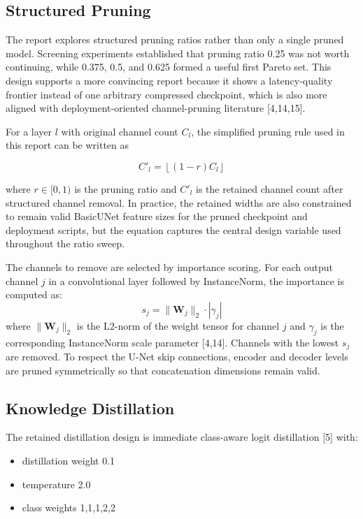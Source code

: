 \hypertarget{structured-pruning}{%
\subsection{Structured Pruning}\label{structured-pruning}}

The report explores structured pruning ratios rather than only a single
pruned model. Screening experiments established that pruning ratio
0.25 was not worth continuing, while 0.375,
0.5, and 0.625 formed a useful first Pareto set. This
design supports a more convincing report because it shows a
latency-quality frontier instead of one arbitrary compressed checkpoint,
which is also more aligned with deployment-oriented channel-pruning
literature {[}4,14,15{]}.

For a layer \(l\) with original channel count \(C_l\), the simplified
pruning rule used in this report can be written as

\[
C'_l = \left\lfloor (1-r) C_l \right\rfloor
\]

where \(r \in [0,1)\) is the pruning ratio and \(C'_l\) is the retained
channel count after structured channel removal. In practice, the
retained widths are also constrained to remain valid BasicUNet feature
sizes for the pruned checkpoint and deployment scripts, but the equation captures the central design variable used throughout the ratio sweep.

The channels to remove are selected by importance scoring. For each output channel $j$ in a convolutional layer followed by InstanceNorm, the importance is computed as:
\[
s_j = \| \mathbf{W}_j \|_2 \cdot |\gamma_j|
\]
where $\| \mathbf{W}_j \|_2$ is the L2-norm of the weight tensor for channel $j$ and $\gamma_j$ is the corresponding InstanceNorm scale parameter {[}4,14{]}. Channels with the lowest $s_j$ are removed. To respect the U-Net skip connections, encoder and decoder levels are pruned symmetrically so that concatenation dimensions remain valid.

\hypertarget{knowledge-distillation}{%
\subsection{Knowledge Distillation}\label{knowledge-distillation}}

The retained distillation design is immediate class-aware logit
distillation {[}5{]} with:

\begin{itemize}
\tightlist
\item
  distillation weight 0.1
\item
  temperature 2.0
\item
  class weights 1,1,1,2,2
\end{itemize}


